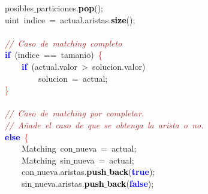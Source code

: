 \mbox{}\ \ \ \ \ \ \ \ posibles$\_$particiones\textcolor{BrickRed}{.}\textbf{\textcolor{Black}{pop}}\textcolor{BrickRed}{();} \\
\mbox{}\ \ \ \ \ \ \ \ \textcolor{TealBlue}{uint}\ indice\ \textcolor{BrickRed}{=}\ actual\textcolor{BrickRed}{.}aristas\textcolor{BrickRed}{.}\textbf{\textcolor{Black}{size}}\textcolor{BrickRed}{();} \\
\mbox{} \\
\mbox{}\ \ \ \ \ \ \ \ \textit{\textcolor{Brown}{//\ Caso\ de\ matching\ completo}} \\
\mbox{}\ \ \ \ \ \ \ \ \textbf{\textcolor{Blue}{if}}\ \textcolor{BrickRed}{(}indice\ \textcolor{BrickRed}{==}\ tamanio\textcolor{BrickRed}{)}\ \textcolor{Red}{\{} \\
\mbox{}\ \ \ \ \ \ \ \ \ \ \ \ \textbf{\textcolor{Blue}{if}}\ \textcolor{BrickRed}{(}actual\textcolor{BrickRed}{.}valor\ \textcolor{BrickRed}{\textgreater{}}\ solucion\textcolor{BrickRed}{.}valor\textcolor{BrickRed}{)} \\
\mbox{}\ \ \ \ \ \ \ \ \ \ \ \ \ \ \ \ solucion\ \textcolor{BrickRed}{=}\ actual\textcolor{BrickRed}{;} \\
\mbox{}\ \ \ \ \ \ \ \ \textcolor{Red}{\}} \\
\mbox{} \\
\mbox{}\ \ \ \ \ \ \ \ \textit{\textcolor{Brown}{//\ Caso\ de\ matching\ por\ completar.}} \\
\mbox{}\ \ \ \ \ \ \ \ \textit{\textcolor{Brown}{//\ Añade\ el\ caso\ de\ que\ se\ obtenga\ la\ arista\ o\ no.}} \\
\mbox{}\ \ \ \ \ \ \ \ \textbf{\textcolor{Blue}{else}}\ \textcolor{Red}{\{} \\
\mbox{}\ \ \ \ \ \ \ \ \ \ \ \ \textcolor{TealBlue}{Matching}\ con$\_$nueva\ \textcolor{BrickRed}{=}\ actual\textcolor{BrickRed}{;} \\
\mbox{}\ \ \ \ \ \ \ \ \ \ \ \ \textcolor{TealBlue}{Matching}\ sin$\_$nueva\ \textcolor{BrickRed}{=}\ actual\textcolor{BrickRed}{;} \\
\mbox{}\ \ \ \ \ \ \ \ \ \ \ \ con$\_$nueva\textcolor{BrickRed}{.}aristas\textcolor{BrickRed}{.}\textbf{\textcolor{Black}{push$\_$back}}\textcolor{BrickRed}{(}\textbf{\textcolor{Blue}{true}}\textcolor{BrickRed}{);} \\
\mbox{}\ \ \ \ \ \ \ \ \ \ \ \ sin$\_$nueva\textcolor{BrickRed}{.}aristas\textcolor{BrickRed}{.}\textbf{\textcolor{Black}{push$\_$back}}\textcolor{BrickRed}{(}\textbf{\textcolor{Blue}{false}}\textcolor{BrickRed}{);} \\
